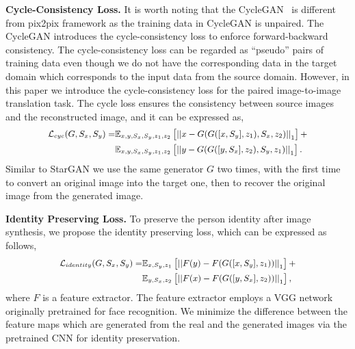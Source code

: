\documentclass[sigconf]{acmart}
\begin{document}
\noindent \textbf{Cycle-Consistency Loss.}
It is worth noting that the CycleGAN~\cite{zhu2017unpaired} is different from pix2pix framework \cite{isola2017image} as the training data in CycleGAN is unpaired. 
The CycleGAN introduces the cycle-consistency loss to enforce forward-backward consistency.
The cycle-consistency loss can be regarded as ``pseudo'' pairs of training data even though we do not have the corresponding data in the target domain which corresponds to the input data from the source domain.
However, in this paper we introduce the cycle-consistency loss for the paired image-to-image translation task.
The cycle loss ensures the consistency between source images and the reconstructed image, and it can be expressed as,
\begin{equation} \small
\begin{aligned}
\mathcal{L}_{cyc}(G, S_x, S_y) = &  \mathbb{E}_{x, y, S_x, S_y, z_1, z_2} \left[ \left|\left| x - G(G([x, S_y], z_1), S_x, z_2) \right|\right|_1 \right] + \\
& \mathbb{E}_{x, y, S_x, S_y, z_1, z_2} \left[ \left|\left| y - G(G([y, S_x], z_2), S_y, z_1) \right|\right|_1 \right].
\end{aligned}
\label{eqn:con}
\end{equation}
Similar to StarGAN \cite{choi2017stargan} we use the same generator $G$ two times, with the first time to convert an original image into the target one, then to recover the original image from the generated image.

\noindent \textbf{Identity Preserving Loss.} To preserve the person identity after image synthesis, we propose the identity preserving loss, which can be expressed as follows,
\begin{equation}\small
\begin{aligned}
\mathcal{L}_{identity}(G,S_x, S_y) = & \mathbb{E}_{x, S_y, z_1} \left[ \left|\left| F(y) - F(G([x, S_y], z_1)) \right|\right|_1 \right]+\\
&  \mathbb{E}_{y, S_x, z_2} \left[ \left|\left| F(x) - F(G([y, S_x], z_2)) \right|\right|_1 \right],
\end{aligned}
\label{eqn:preserve}
\end{equation}
where $F$ is a feature extractor. 
The feature extractor employs a VGG network \cite{simonyan2014very} originally pretrained for face recognition.
We minimize the difference between the feature maps which are generated from the real and the generated images via the pretrained CNN for identity preservation. 
\end{document}
